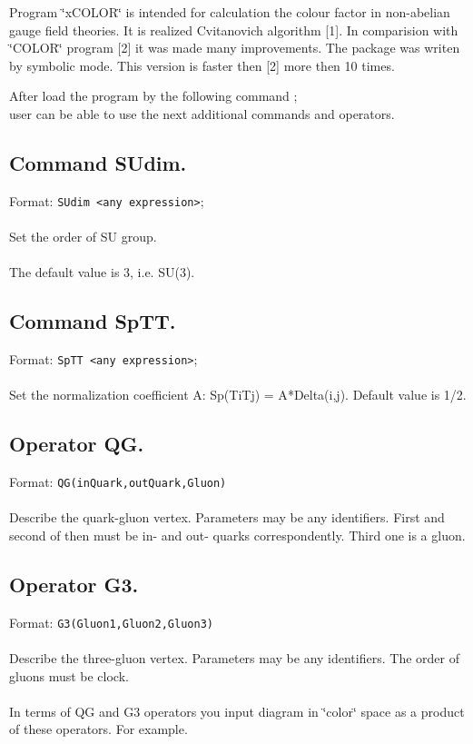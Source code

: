 
Program \char`\"{}xCOLOR\char`\"{} is intended for calculation the colour
factor in non-abelian gauge field theories. It is 
realized Cvitanovich algorithm {[}1{]}. In comparision with
\char`\"{}COLOR\char`\"{} program {[}2{]} it was made many improvements.
The package was writen by symbolic mode. This version is
faster then {[}2{]} more then 10 times.


After load the program by the following command ; \\
user can be able to use the next additional commands and operators. 

\subsection*{Command SUdim.}

Format: {\tt SUdim <any expression>}; \\
\ \\
Set the order of SU group. \\
\ \\
The default value is 3, i.e. SU(3). 

\subsection*{Command SpTT.}

Format: {\tt SpTT <any expression>}; \\
\ \\
Set the normalization coefficient A: Sp(TiTj) = A{*}Delta(i,j).
Default value is 1/2. 

\subsection*{Operator QG.}

Format: {\tt QG(inQuark,outQuark,Gluon)} \\
\ \\
Describe the quark-gluon vertex. Parameters may be any identifiers.
First and second of then must be in- and out- quarks correspondently.
Third one is a gluon. 

\subsection*{Operator G3.}

Format: {\tt G3(Gluon1,Gluon2,Gluon3)} \\
\ \\
Describe the three-gluon vertex. Parameters may be any identifiers.
The order of gluons must be clock. \\
\ \\
In terms of QG and G3 operators you input diagram in \char`\"{}color\char`\"{}
space as a product of these operators. For example. 

